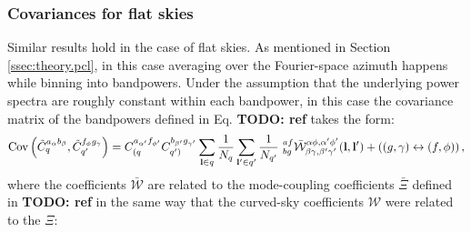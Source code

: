 \documentclass[a4paper,11pt]{article}
\newcommand{\todo}[1]{{\bf TODO: #1}}
\begin{document}
      \subsubsection{Covariances for flat skies}
        Similar results hold in the case of flat skies. As mentioned in Section \ref{ssec:theory.pcl}, in this case averaging over the Fourier-space azimuth happens while binning into bandpowers. Under the assumption that the underlying power spectra are roughly constant within each bandpower, in this case the covariance matrix of the bandpowers defined in Eq. \todo{ref} takes the form:
        \begin{equation}\label{eq:cov_flat}
          {\rm Cov}\left(\tilde{C}^{a_\alpha b_\beta}_q,\tilde{C}^{f_\phi g_\gamma}_{q'}\right) = C^{a_{\alpha'} f_{\phi'}}_{(q}C^{b_{\beta'} g_{\gamma'}}_{q')}\sum_{{\bf l}\in q} \frac{1}{N_q} \sum_{{\bf l}' \in q'} \frac{1}{N_{q'}}\,\,^{af}_{bg}\bar{\mathcal{W}}^{\alpha\phi,\alpha'\phi'}_{\beta\gamma,\beta'\gamma'}({\bf l},{\bf l}')+\left((g,\gamma)\leftrightarrow(f,\phi)\right),
        \end{equation}
        where the coefficients $\bar{\mathcal{W}}$ are related to the mode-coupling coefficients $\bar{\Xi}$ defined in \todo{ref} in the same way that the curved-sky coefficients $\mathcal{W}$ were related to the $\Xi$:
\end{document}

